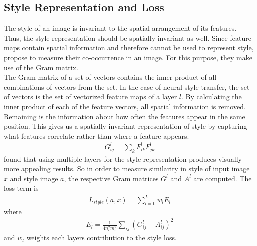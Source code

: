 \documentclass{seminar}
\begin{document}
	\subsection{Style Representation and Loss}
	The style of an image is invariant to the spatial arrangement of its features. Thus, the style representation should be spatially invariant as well. Since feature maps contain spatial information and therefore cannot be used to represent style, \cite{gatys2015neural} propose to measure their co-occurrence in an image. For this purpose, they make use of the Gram matrix.\\
	The Gram matrix of a set of vectors contains the inner product of all combinations of vectors from the set. In the case of neural style transfer, the set of vectors is the set of vectorized feature maps of a layer $l$.
	By calculating the inner product of each of the feature vectors, all spatial information is removed. Remaining is the information about how often the features appear in the same position. This gives us a spatially invariant representation of style by capturing what features correlate rather than where a feature appears.
	\begin{align}
	G^l_{ij} = \sum_{k} F^l_{ik}F^l_{jk}
	\end{align}
	\cite{gatys2015neural} found that using multiple layers for the style representation produces visually more appealing results. So in order to measure similarity in style of input image $x$ and style image $a$, the respective Gram matrices $G^l$ and $A^l$ are computed.
	The loss term is
	\begin{align*}
	L_{style}(a,x) = \sum^L_{l=0}w_l E_l
	\end{align*}
	where 
	\begin{align*}
	E_l = \frac{1}{4n^2_lm^2_l}\sum_{ij}(G^l_{ij}-A^l_{ij})^2
	\end{align*}
	and $w_l$ weights each layers contribution to the style loss.
	
\end{document}
